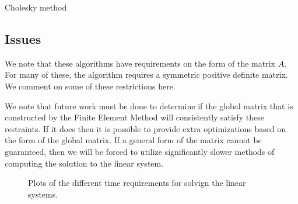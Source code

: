 \documentclass[../fem.tex]{subfile}
\begin{document}
\begin{algorithm}[H]
  \caption{Cholesky method}\label{algo:cholesky_method}
  \begin{algorithmic}
    \State{}
    \EndFor
    \EndFor
    \EndFor
    \EndFor
    \State{}
    \EndFor
    \EndFor
    \State{}
    \EndFor
    \EndFor
  \end{algorithmic}
\end{algorithm}

\subsection{Issues}%
\label{sub:issues}

We note that these algorithms have requirements on the form of the matrix $A$.
For many of these, the algorithm requires a symmetric positive definite matrix.
We comment on some of these restrictions here.

We note that future work must be done to determine if the global matrix that is
constructed by the Finite Element Method will consistently satisfy these
restraints. If it does then it is possible to provide extra optimizations based
on the form of the global matrix. If a general form of the matrix cannot be
guaranteed, then we will be forced to utilize significantly slower methods of
computing the solution to the linear system.

\begin{figure}[htpb]
  \centering
   
  \caption{Plots of the different time requirements for solvign the linear
  systems.}
  \label{fig:times}
\end{figure}
\end{document}
